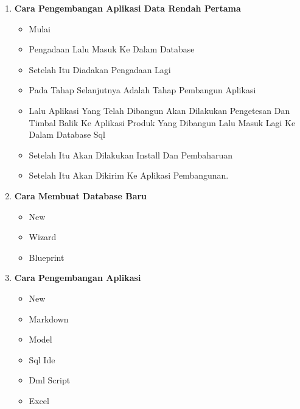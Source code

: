 \documentclass{article}
\begin{document}
\begin{enumerate}
\begin{itemize}
\end{itemize}
\item \textbf{Cara Pengembangan Aplikasi Data Rendah Pertama}
\begin{itemize}
\item  Mulai
\item Pengadaan Lalu Masuk Ke Dalam Database
\item Setelah Itu Diadakan Pengadaan Lagi
\item Pada Tahap Selanjutnya Adalah Tahap Pembangun Aplikasi
\item Lalu Aplikasi Yang Telah Dibangun Akan Dilakukan Pengetesan Dan Timbal Balik Ke Aplikasi Produk Yang Dibangun Lalu Masuk Lagi Ke Dalam Database Sql
\item Setelah Itu Akan Dilakukan Install Dan Pembaharuan
\item Setelah Itu Akan Dikirim Ke Aplikasi Pembangunan.\\

\end{itemize}
\item \textbf{Cara Membuat Database Baru}
\begin{itemize}
\item New
\item Wizard
\item Blueprint

\end{itemize}
\item \textbf{Cara Pengembangan Aplikasi}
\begin{itemize}
\item  New
\item Markdown
\item Model
\item Sql Ide
\item Dml Script
\item Excel\\


\end{itemize}
\end{enumerate}
\end{document}
